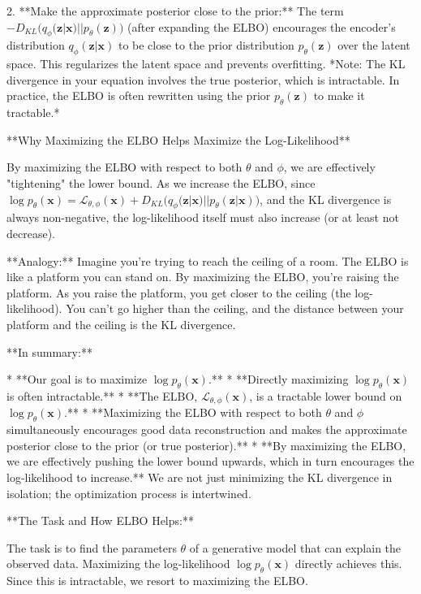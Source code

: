 \documentclass{article}
\begin{document}
2. **Make the approximate posterior close to the prior:** The term $-D_{KL} \big( q_{\phi}(\bm{z} | \bm{x}) || p_{\theta}(\bm{z}) \big)$ (after expanding the ELBO) encourages the encoder's distribution $q_{\phi}(\mathbf{z}|\mathbf{x})$ to be close to the prior distribution $p_{\theta}(\mathbf{z})$ over the latent space. This regularizes the latent space and prevents overfitting. *Note: The KL divergence in your equation involves the true posterior, which is intractable. In practice, the ELBO is often rewritten using the prior $p_\theta(\mathbf{z})$ to make it tractable.*

**Why Maximizing the ELBO Helps Maximize the Log-Likelihood**

By maximizing the ELBO with respect to both $\theta$ and $\phi$, we are effectively "tightening" the lower bound. As we increase the ELBO, since $\log p_{\theta}(\bm{x}) = \mathcal{L}_{\theta, \phi}(\bm{x}) + D_{KL} \big( q_{\phi}(\bm{z} | \bm{x}) || p_{\theta}(\bm{z} | \bm{x}) \big)$, and the KL divergence is always non-negative, the log-likelihood itself must also increase (or at least not decrease).

**Analogy:** Imagine you're trying to reach the ceiling of a room. The ELBO is like a platform you can stand on. By maximizing the ELBO, you're raising the platform. As you raise the platform, you get closer to the ceiling (the log-likelihood). You can't go higher than the ceiling, and the distance between your platform and the ceiling is the KL divergence.

**In summary:**

* **Our goal is to maximize $\log p_{\theta}(\mathbf{x})$.**
* **Directly maximizing $\log p_{\theta}(\mathbf{x})$ is often intractable.**
* **The ELBO, $\mathcal{L}_{\theta, \phi}(\bm{x})$, is a tractable lower bound on $\log p_{\theta}(\mathbf{x})$.**
* **Maximizing the ELBO with respect to both $\theta$ and $\phi$ simultaneously encourages good data reconstruction and makes the approximate posterior close to the prior (or true posterior).**
* **By maximizing the ELBO, we are effectively pushing the lower bound upwards, which in turn encourages the log-likelihood to increase.**  We are not just minimizing the KL divergence in isolation; the optimization process is intertwined.

**The Task and How ELBO Helps:**

The task is to find the parameters $\theta$ of a generative model that can explain the observed data. Maximizing the log-likelihood $\log p_{\theta}(\mathbf{x})$ directly achieves this. Since this is intractable, we resort to maximizing the ELBO.
\end{document}
